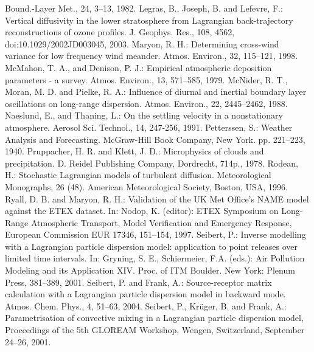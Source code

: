 \documentclass{egu}                  %
\begin{document}
\begin{thebibliography}{}
Bound.-Layer Met., 24, 3--13, 1982.
Legras, B., Joseph, B. and Lefevre, F.:
Vertical diffusivity in the lower stratosphere from Lagrangian back-trajectory reconstructions of ozone profiles.
J. Geophys. Res., 108, 4562, doi:10.1029/2002JD003045, 2003.
Maryon, R. H.:
Determining cross-wind variance for low frequency wind meander.
Atmos. Environ., 32, 115--121, 1998.
McMahon, T. A., and Denison, P. J.:
Empirical atmospheric deposition parameters - a survey.
Atmos. Environ., 13, 571--585, 1979.
McNider, R. T., Moran, M. D. and Pielke, R. A.:
Influence of diurnal and inertial boundary layer oscillations on long-range dispersion.
Atmos. Environ., 22, 2445--2462, 1988.
Naeslund, E., and Thaning, L.:
On the settling velocity in a nonstationary atmosphere.
Aerosol Sci. Technol., 14, 247-256, 1991.
Petterssen, S.:
Weather Analysis and Forecasting.
McGraw-Hill Book Company, New York. pp. 221--223, 1940.
Pruppacher, H. R. and Klett, J. D.:
Microphysics of clouds and precipitation.
D. Reidel Publishing Company, Dordrecht, 714p., 1978.
Rodean, H.:
Stochastic Lagrangian models of turbulent diffusion.
Meteorological Monographs, 26 (48). American Meteorological Society, Boston, USA, 1996.
Ryall, D. B. and Maryon, R. H.:
Validation of the UK Met Office's NAME model against the ETEX dataset. In: Nodop, K. (editor): ETEX Symposium on Long-Range Atmospheric Transport, Model Verification and Emergency Response, European Commission EUR 17346, 151--154, 1997.
Seibert, P.:
Inverse modelling with a Lagrangian particle dispersion model:  application to point releases over limited time intervals. In: Gryning, S. E., Schiermeier, F.A.  (eds.): Air Pollution Modeling and its Application XIV. Proc. of ITM Boulder. New York: Plenum Press, 381--389, 2001.
Seibert, P. and Frank, A.:
Source-receptor matrix calculation with a Lagrangian particle dispersion model in backward mode.
Atmos. Chem. Phys., 4, 51--63, 2004.
Seibert, P., Kr\"uger, B. and Frank, A.:
Parametrisation of convective mixing in a Lagrangian particle dispersion model, Proceedings of the 5th GLOREAM Workshop, Wengen, Switzerland, September 24--26, 2001.

\end{thebibliography}
\end{document}
